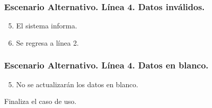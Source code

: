 \subsubsection{Escenario Alternativo. L\'{i}nea 4. Datos inv\'{a}lidos.}
\begin{enumerate}
\setcounter{enumi}{4}
\item El sistema informa.
\item Se regresa a l\'{i}nea 2.
\end{enumerate}
\subsubsection{Escenario Alternativo. L\'{i}nea 4. Datos en blanco.}
\begin{enumerate}
\setcounter{enumi}{4}
\item No se actualizar\'{a}n los datos en blanco.
\end{enumerate}
Finaliza el caso de uso.